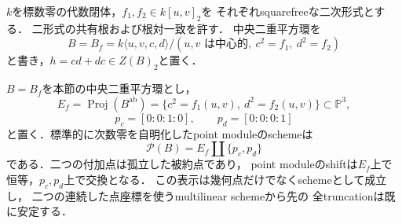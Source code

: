 $k$を標数零の代数閉体，$f_1,f_2\in k[u,v]_2$を
それぞれsquarefreeな二次形式とする．
二形式の共有根および根対一致を許す．
中央二重平方環を
\[
 B=B_f=k\langle u,v,c,d\rangle/
   (u,v\text{ は中心的},\ c^2=f_1,\ d^2=f_2)
\]
と書き，$h=cd+dc\in Z(B)_2$と置く．
\begin{proposition}
\label{prop:qa-noncubic-full-point-scheme}
$B=B_f$を本節の中央二重平方環とし，
\[
 E_f=\operatorname{Proj}(B^{\mathrm{ab}})
     =\{c^2=f_1(u,v),\ d^2=f_2(u,v)\}\subset\mathbb P^3,
\]
\[
 p_c=[0:0:1:0],\qquad p_d=[0:0:0:1]
\]
と置く．標準的に次数零を自明化したpoint moduleのschemeは
\[
                 \mathcal P(B)=E_f\amalg\{p_c,p_d\}
\]
である．二つの付加点は孤立した被約点であり，
point moduleのshiftは$E_f$上で恒等，$p_c,p_d$上で交換となる．
この表示は幾何点だけでなくschemeとして成立し，
二つの連続した点座標を使うmultilinear schemeから先の
全truncationは既に安定する．
\end{proposition}
